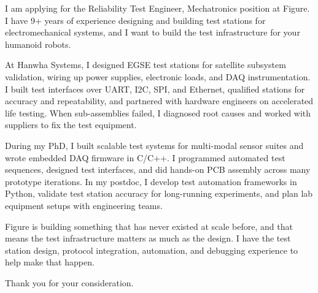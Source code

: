 \documentclass[letterpaper,11pt]{moderncv}
\date{\today}
\begin{document}
\makelettertitle

I am applying for the Reliability Test Engineer, Mechatronics position at Figure. I have 9+ years of experience designing and building test stations for electromechanical systems, and I want to build the test infrastructure for your humanoid robots.

At Hanwha Systems, I designed EGSE test stations for satellite subsystem validation, wiring up power supplies, electronic loads, and DAQ instrumentation. I built test interfaces over UART, I2C, SPI, and Ethernet, qualified stations for accuracy and repeatability, and partnered with hardware engineers on accelerated life testing. When sub-assemblies failed, I diagnosed root causes and worked with suppliers to fix the test equipment.

During my PhD, I built scalable test systems for multi-modal sensor suites and wrote embedded DAQ firmware in C/C++. I programmed automated test sequences, designed test interfaces, and did hands-on PCB assembly across many prototype iterations. In my postdoc, I develop test automation frameworks in Python, validate test station accuracy for long-running experiments, and plan lab equipment setups with engineering teams.

Figure is building something that has never existed at scale before, and that means the test infrastructure matters as much as the design. I have the test station design, protocol integration, automation, and debugging experience to help make that happen.

Thank you for your consideration.

\makeletterclosing
\end{document}

